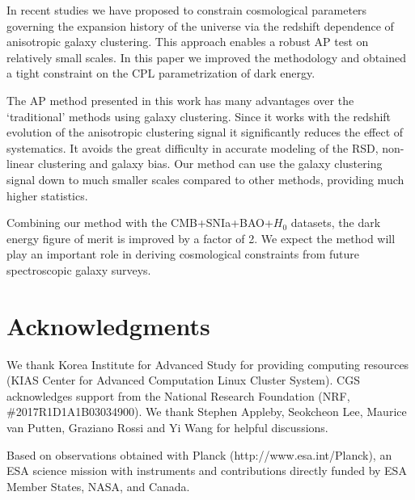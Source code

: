 \documentclass[iop]{emulateapj}
\begin{document}
In recent studies we have proposed to constrain cosmological parameters 
governing the expansion history of the universe via 
the redshift dependence of anisotropic galaxy clustering\cite{Li2016}.
This approach enables a robust AP test on relatively small scales.
In this paper we improved the methodology and obtained a tight constraint 
on the CPL parametrization of dark energy.


The AP method presented in this work has many advantages over the 
`traditional' methods using galaxy clustering.
Since it works with the redshift evolution of the anisotropic clustering signal it significantly reduces the effect of systematics. 
It avoids the great difficulty in accurate modeling of the RSD, non-linear clustering and galaxy bias.
Our method can use the galaxy clustering signal down to
much smaller scales compared to other methods,
providing much higher statistics.

Combining our method with the CMB+SNIa+BAO+$H_0$ datasets,
the dark energy figure of merit is improved by a factor of 2.
We expect the method will play an important role in deriving cosmological constraints from future spectroscopic galaxy surveys.



\section*{Acknowledgments}

We thank Korea Institute for Advanced Study for providing computing resources (KIAS Center for Advanced Computation Linux Cluster System).
CGS acknowledges support from the National Research Foundation (NRF,  \#2017R1D1A1B03034900). 
We thank Stephen Appleby, Seokcheon Lee, Maurice van Putten, Graziano Rossi and Yi Wang for helpful discussions.

Based on observations obtained with Planck (http://www.esa.int/Planck), 
an ESA science mission with instruments and contributions directly funded by 
ESA Member States, NASA, and Canada.
\end{document}
